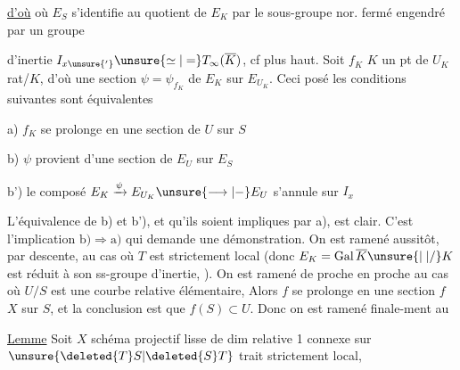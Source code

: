 \uline{d'où}
où $E_S$ s'identifie au quotient de $E_K$ par le sous-groupe nor. fermé engendré par un groupe

d'inertie $I_{x\unsure{'}}\unsure{\simeq|=}T_\infty(\overline K)$, cf plus haut. Soit $f_K$ $K$ un pt de $U_K$ rat/$K$, d'où une section $\psi=\psi_{f_K}$ de $E_K$ sur $E_{U_K}$. Ceci posé les conditions suivantes sont équivalentes

\noindent a) $f_K$ se prolonge en une section de $U$ sur $S$

\noindent b) $\psi$ provient d'une section de $E_U$ sur $E_S$

\noindent b') le composé $E_K\xrightarrow{\psi}E_{U_K}\unsure{\longrightarrow|-}E_U$ s'annule sur $I_x$


L'équivalence de b) et b'), et qu'ils soient impliques par a), est clair. C'est l'implication $\mathrm{b)}\Longrightarrow\mathrm{a)}$ qui demande une démonstration. On est ramené aussitôt, par descente, au cas  où $T$ est strictement local (donc $E_K=\operatorname{Gal}\overline K\unsure{\mid|/}K$ est réduit à son ss-groupe d'inertie, ). On est ramené de proche en proche au cas où $U/S$ est une courbe relative élémentaire,   \unsure{\deleted{,}|,}  Alors $f$ se prolonge en une section $f$   $X$ sur $S$, et la conclusion est que $f(S)\subset U$. Donc on est ramené finale-\newline ment au

\uline{Lemme} Soit $X$ schéma projectif lisse de dim relative 1 connexe sur $\unsure{\deleted{T}S|\deleted{S}T}$ trait strictement local,

